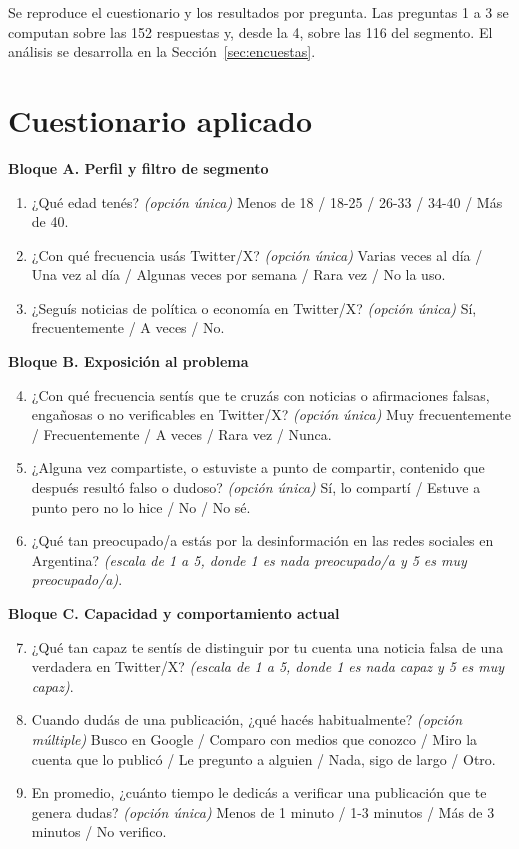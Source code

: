 \label{anexo:encuesta}

Se reproduce el cuestionario y los resultados por pregunta. Las preguntas 1 a 3 se computan sobre las 152 respuestas y, desde la 4, sobre las 116 del segmento. El análisis se desarrolla en la Sección~\ref{sec:encuestas}.

\section*{Cuestionario aplicado}

\textbf{Bloque A. Perfil y filtro de segmento}

\begin{enumerate}
  \item ¿Qué edad tenés? \emph{(opción única)} Menos de 18 / 18-25 / 26-33 / 34-40 / Más de 40.
  \item ¿Con qué frecuencia usás Twitter/X? \emph{(opción única)} Varias veces al día / Una vez al día / Algunas veces por semana / Rara vez / No la uso.
  \item ¿Seguís noticias de política o economía en Twitter/X? \emph{(opción única)} Sí, frecuentemente / A veces / No.
\end{enumerate}

\textbf{Bloque B. Exposición al problema}

\begin{enumerate}\setcounter{enumi}{3}
  \item ¿Con qué frecuencia sentís que te cruzás con noticias o afirmaciones falsas, engañosas o no verificables en Twitter/X? \emph{(opción única)} Muy frecuentemente / Frecuentemente / A veces / Rara vez / Nunca.
  \item ¿Alguna vez compartiste, o estuviste a punto de compartir, contenido que después resultó falso o dudoso? \emph{(opción única)} Sí, lo compartí / Estuve a punto pero no lo hice / No / No sé.
  \item ¿Qué tan preocupado/a estás por la desinformación en las redes sociales en Argentina? \emph{(escala de 1 a 5, donde 1 es nada preocupado/a y 5 es muy preocupado/a)}.
\end{enumerate}

\textbf{Bloque C. Capacidad y comportamiento actual}

\begin{enumerate}\setcounter{enumi}{6}
  \item ¿Qué tan capaz te sentís de distinguir por tu cuenta una noticia falsa de una verdadera en Twitter/X? \emph{(escala de 1 a 5, donde 1 es nada capaz y 5 es muy capaz)}.
  \item Cuando dudás de una publicación, ¿qué hacés habitualmente? \emph{(opción múltiple)} Busco en Google / Comparo con medios que conozco / Miro la cuenta que lo publicó / Le pregunto a alguien / Nada, sigo de largo / Otro.
  \item En promedio, ¿cuánto tiempo le dedicás a verificar una publicación que te genera dudas? \emph{(opción única)} Menos de 1 minuto / 1-3 minutos / Más de 3 minutos / No verifico.
\end{enumerate}

